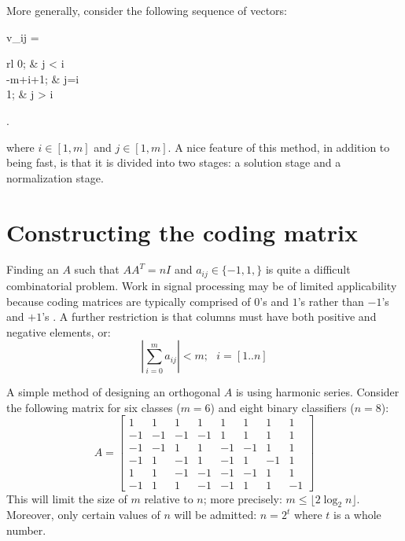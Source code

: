 More generally, consider the following sequence of vectors:
\begin{eqnnon}
	v_{ij} =  \left \lbrace \begin{array}{rl}
			0; & j < i \\
			-m+i+1; & j=i \\
			1; & j > i
		\end{array} \right .
\end{eqnnon}
where $i \in [1, m]$ and $j \in [1, m]$. \citep{Boyd_Vandenberghe2004}
A nice feature of this method, in addition to being fast,
is that it is divided into two stages: a solution stage and a normalization stage.

\section{Constructing the coding matrix}

\label{construction}

Finding an $A$ such that $A A^T = n I$ and $a_{ij} \in \lbrace -1, 1, \rbrace$
is quite a difficult combinatorial problem.
Work in signal processing may be of limited applicability because coding
matrices are typically comprised of $0$'s and $1$'s 
rather than $-1$'s and $+1$'s \citep{Hedayat_etal1999,Panse_etal2014}.
A further restriction is that
columns must have both positive and negative elements, or:
\begin{equation}
	\left | \sum_{i=0}^m a_{ij} \right | < m;  ~~~ i=[1..n] \label{restriction}
\end{equation}

A simple method of designing an orthogonal $A$ is using harmonic series.
Consider the following matrix for six classes ($m=6$) 
and eight binary classifiers ($n=8$):
\begin{equation}
	A = \left [ \begin{array}{rrrrrrrr}
			 1 & 1 & 1 & 1 & 1 & 1 & 1 & 1 \\
			-1 & -1 & -1 & -1 & 1 & 1 & 1 & 1 \\
			-1 & -1 & 1 & 1 & -1 & -1 & 1 & 1 \\
			-1 & 1 & -1 & 1 & -1 & 1 & -1 & 1 \\
			 1 &  1 & -1 & -1 & -1 & -1 & 1 & 1 \\
			-1 & 1 & 1 & -1 & -1 & 1 & 1 & -1 
	\end{array} \right ]
	\label{harmonic}
\end{equation}
This will limit the size of $m$ relative to $n$; more precisely:
$m \le \lfloor 2 \log_2 n \rfloor$. Moreover, only certain values of $n$
will be admitted: $n=2^t$ where $t$ is a whole number.


